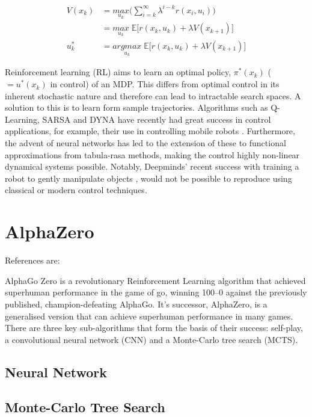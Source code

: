 \documentclass[12pt]{report}
\begin{document}
\begin{align}
    \label{equ:mdpval} 
    V(x_k) & = \underset{u_k}{max} \bigg( \sum_{i=k}^{\infty} \lambda^{i-k} r(x_i, u_i) \bigg) \\ 
    & = \underset{u_k}{max} \; \mathbb{E} \Big[ r(x_k, u_k) + \lambda V(x_{k+1}) \Big] \\
    u^{*}_k & = \underset{u_k}{argmax}\; \mathbb{E} \Big[ r(x_k, u_k) + \lambda V(x_{k+1}) \Big]
\end{align}

Reinforcement learning (RL) aims to learn an optimal policy, $\pi^{*}(x_k)$ ($=u^{*}(x_k)$ in control) of an MDP. This differs from optimal control in its inherent stochastic nature and therefore can lead to intractable search spaces. A solution to this is to learn form sample trajectories. Algorithms such as Q-Learning, SARSA and DYNA have recently had great success in control applications, for example, their use in controlling mobile robots \cite{Qlearning}. Furthermore, the advent of neural networks has led to the extension of these to functional approximations from tabula-rasa methods, making the control highly non-linear dynamical systems possible. Notably, Deepminds' recent success with training a robot to gently manipulate objects \cite{Robothand}, would not be possible to reproduce using classical or modern control techniques.

\section{AlphaZero}
References are: \cite{AlphaGoZero} \cite{AlphaZero} \cite{RLoverview}

AlphaGo Zero is a revolutionary Reinforcement Learning algorithm that achieved superhuman performance in the game of go, winning 100–0 against the previously published, champion-defeating AlphaGo. It's successor, AlphaZero, is a generalised version that can achieve superhuman performance in many games. There are three key sub-algorithms that form the basis of their success: self-play, a convolutional neural network (CNN) and a Monte-Carlo tree search (MCTS). 

\subsection{Neural Network}
\subsection{Monte-Carlo Tree Search}
\end{document}
